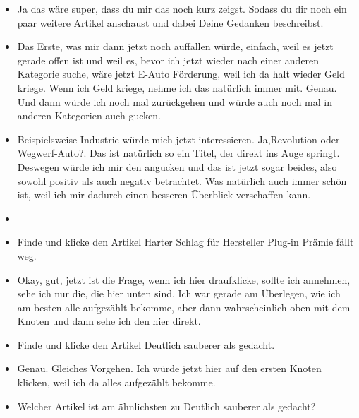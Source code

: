 {\begin{itemize}[]
                  Wenn ich jetzt aber mich noch nicht damit auskennen würde, dann wäre mir das wahrscheinlich nicht so klar.
                  Dann müsste ich mir wahrscheinlich alle Artikel durchlesen, um dann wirklich diese Gegenposition zu finden.
                  Genau so würde ich mich jetzt weiter vorarbeiten.
            \item {} Ja das wäre super, dass du mir das noch kurz zeigst.
                  Sodass du dir noch ein paar weitere Artikel anschaust und dabei Deine Gedanken beschreibst.
            \item {} Das Erste, was mir dann jetzt noch auffallen würde, einfach, weil es jetzt gerade offen ist und weil es, bevor ich jetzt wieder nach einer anderen Kategorie suche, wäre jetzt \flqq E-Auto Förderung\frqq{}, weil ich da halt wieder Geld kriege.
                  Wenn ich Geld kriege, nehme ich das natürlich immer mit.
                  Genau.
                  Und dann würde ich noch mal zurückgehen und würde auch noch mal in anderen Kategorien auch gucken.
            \item {} Beispielsweise Industrie würde mich jetzt interessieren.
                  Ja,\flqq Revolution oder Wegwerf-Auto?\frqq{}.
                  Das ist natürlich so ein Titel, der direkt ins Auge springt.
                  Deswegen würde ich mir den angucken und das ist jetzt sogar beides, also sowohl positiv als auch negativ betrachtet.
                  Was natürlich auch immer schön ist, weil ich mir dadurch einen besseren Überblick verschaffen kann.
            \item {}
            \item {} Finde und klicke den Artikel \flqq Harter Schlag für Hersteller Plug-in Prämie fällt weg\frqq{}.
            \item {} Okay, gut, jetzt ist die Frage, wenn ich hier draufklicke, sollte ich annehmen, sehe ich nur die, die hier unten sind.
                  Ich war gerade am Überlegen, wie ich am besten alle aufgezählt bekomme, aber dann wahrscheinlich oben mit dem Knoten und dann sehe ich den hier direkt.
            \item {} Finde und klicke den Artikel \flqq Deutlich sauberer als gedacht\frqq{}.
            \item {} Genau. Gleiches Vorgehen. Ich würde jetzt hier auf den ersten Knoten klicken, weil ich da alles aufgezählt bekomme.
            \item {} Welcher Artikel ist am ähnlichsten zu \flqq Deutlich sauberer als gedacht\frqq{}?

\end{itemize}}

